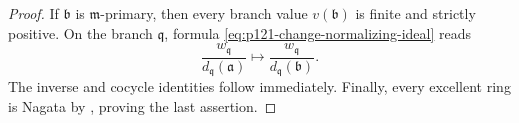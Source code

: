 \begin{proof}
If \(\mathfrak b\) is \(\mathfrak m\)-primary, then every branch value
\(v(\mathfrak b)\) is finite and strictly positive.  On the branch
\(\mathfrak q\), formula \eqref{eq:p121-change-normalizing-ideal} reads
\[
 \frac{w_{\mathfrak q}}{d_{\mathfrak q}(\mathfrak a)}
 \longmapsto
 \frac{w_{\mathfrak q}}{d_{\mathfrak q}(\mathfrak b)}.
\]
The inverse and cocycle identities follow immediately.  Finally, every
excellent ring is Nagata by \cite[Tag~07QV]{StacksProject}, proving the last
assertion.
\end{proof}
